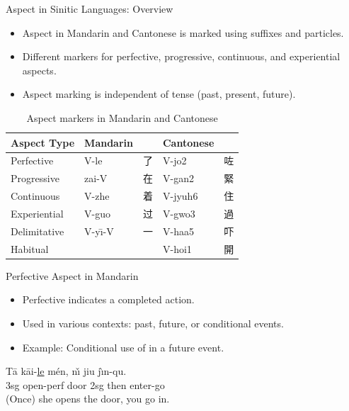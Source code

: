 \documentclass{beamer}
\newcommand{\cmn}{\mtciteform}
\newcommand{\ul}[1]{\uline{#1}}
\begin{document}
\begin{frame}{Aspect in Sinitic Languages: Overview}
\begin{itemize}
    \item Aspect in Mandarin and Cantonese is marked using suffixes and particles.
    \item Different markers for perfective, progressive, continuous, and experiential aspects.
    \item Aspect marking is independent of tense (past, present, future).
    \end{itemize}
    \begin{table}
\begin{tabular}{lllll}

\textbf{Aspect Type} & \textbf{Mandarin} &  & \textbf{Cantonese} & \\
\hline
Perfective   & V-le   & 了   & V-jo2   & 咗 \\
Progressive  & zai-V  & 在   & V-gan2  & 緊 \\
Continuous   & V-zhe  & 着   & V-jyuh6 & 住 \\
  Experiential & V-guo  & 过   & V-gwo3  & 過 \\
  Delimitative	& V-yı̄-V &一 & V-haa5  & 吓 \\
 Habitual	& & & V-hoi1 & 開 \\
\hline
\end{tabular}
\caption{Aspect markers in Mandarin and Cantonese}
\end{table}
\end{frame}

\begin{frame}{Perfective Aspect in Mandarin}
\begin{itemize}
    \item Perfective \cmn{le} indicates a completed action.
    \item Used in various contexts: past, future, or conditional events.
    \item Example: Conditional use of \cmn{le} in a future event.
\end{itemize}
\begin{exe}
\ex
\gll Tā kāi-\ul{le} mén, nı̌ jiu jı̀n-qu. \\
    3sg open-perf door 2sg then enter-go \\
\trans (Once) she opens the door, you go in. \\
\end{exe}
\end{frame}
\end{document}
